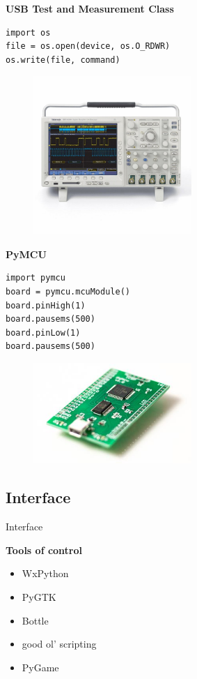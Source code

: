 \documentclass{beamer}
\begin{document}
\begin{frame}[fragile]

\textbf{USB Test and Measurement Class}
\begin{verbatim}
import os
file = os.open(device, os.O_RDWR)
os.write(file, command)
\end{verbatim}

\begin{figure}[ht]
	\includegraphics[width=6cm]{tek.jpg}
\end{figure}

\end{frame}

\begin{frame}[fragile]

\textbf{PyMCU}

\begin{verbatim}
import pymcu
board = pymcu.mcuModule()
board.pinHigh(1)
board.pausems(500)
board.pinLow(1)
board.pausems(500)
\end{verbatim}

\begin{figure}[ht]
	\includegraphics[width=6cm]{pymcu.jpg}
\end{figure}

\end{frame}


\subsection{Interface}

\begin{frame}{Interface}

\textbf{Tools of control}

\begin{itemize}
 \item WxPython
 \item PyGTK
 \item Bottle
 \item good ol' scripting
 \item PyGame
\end{itemize}


\end{frame}
\end{document}

